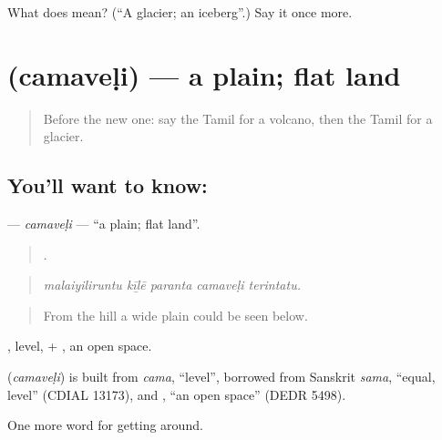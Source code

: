 \begin{tcolorbox}[breakable,colback=teal!4,colframe=teal!35!black,title={Before you move on}]
What does  mean? (\textquotedblleft{}A glacier; an iceberg\textquotedblright{}.) Say it once more.
\end{tcolorbox}
\section[\texorpdfstring{\ta{சமவெளி} (camaveḷi)}{சமவெளி (camaveḷi)}]{ (camaveḷi) — a plain; flat land}

\label{lesson:TA-C433-camaveli}



\begin{quote}
Before the new one: say the Tamil for a volcano, then the Tamil for a glacier.
\end{quote}

\subsection*{You'll want to know: }
\textbf{} — \emph{camaveḷi} — \textquotedblleft{}a plain; flat land\textquotedblright{}.

\begin{quote}
    .
\end{quote}

\begin{quote}
\emph{malaiyiliruntu kīḻē paranta camaveḷi terintatu.}
\end{quote}

\begin{quote}
From the hill a wide plain could be seen below.
\end{quote}

, level, + , an open space.

\begin{cousinweb}
\textbf{} (\emph{camaveḷi}) is built from \emph{cama}, \textquotedblleft{}level\textquotedblright{}, borrowed from Sanskrit \emph{sama}, \textquotedblleft{}equal, level\textquotedblright{} (CDIAL 13173), and , \textquotedblleft{}an open space\textquotedblright{} (DEDR 5498).
\end{cousinweb}

\begin{grammarlens}[title={What you've built}]
One more word for getting around.
\end{grammarlens}

